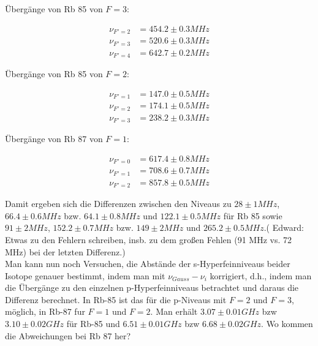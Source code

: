 \documentclass[a4paper,parskip]{scrartcl}
\begin{document}
Übergänge von Rb 85 von $F=3$:

\begin{align*}
\nu_{F'=2} &= 454.2 \pm 0.3 MHz \\
\nu_{F'=3} &= 520.6 \pm 0.3 MHz \\
\nu_{F'=4} &= 642.7 \pm 0.2 MHz  
\end{align*}

Übergänge von Rb 85 von $F=2$:

\begin{align*}
\nu_{F'=1} &= 147.0 \pm 0.5 MHz \\
\nu_{F'=2} &= 174.1 \pm 0.5 MHz \\
\nu_{F'=3} &= 238.2 \pm 0.3 MHz  
\end{align*}

Übergänge von Rb 87 von $F=1$:

\begin{align*}
\nu_{F'=0} &= 617.4 \pm 0.8 MHz \\
\nu_{F'=1} &= 708.6 \pm 0.7 MHz \\
\nu_{F'=2} &= 857.8 \pm 0.5 MHz  
\end{align*}

Damit ergeben sich die Differenzen zwischen den Niveaus zu $28 \pm 1 MHz$, $66.4 \pm 0.6MHz$ bzw. $64.1 \pm 0.8 MHz$ und $122.1 \pm 0.5 MHz$ für Rb 85 sowie $91 \pm 2 MHz$, $152.2 \pm 0.7 MHz$ bzw. $149 \pm 2 MHz$ und  $265.2 \pm 0.5 MHz$.({\color{red} Edward: Etwas zu den Fehlern schreiben, insb. zu dem großen Fehlen (91 MHz vs. 72 MHz) bei der letzten Differenz.})\\

Man  kann nun noch Versuchen, die Abstände der s-Hyperfeinniveaus beider Isotope genauer bestimmt, indem man mit $\nu_{Gauss} - \nu_i$ korrigiert, d.h., indem man die Übergänge zu den einzelnen p-Hyperfeinniveaus betrachtet und daraus die Differenz berechnet. In Rb-85 ist das für die p-Niveaus mit $F=2$ und $F=3$, möglich, in Rb-87 fur $F=1$ und $F=2$. Man erhält
$3.07 \pm 0.01 GHz$ bzw $3.10 \pm 0.02 GHz$ für Rb-85 und $6.51 \pm 0.01 GHz$ bzw $6.68 \pm 0.02 GHz$. {\color{red}Wo kommen die Abweichungen bei Rb 87 her?} 
\end{document}
